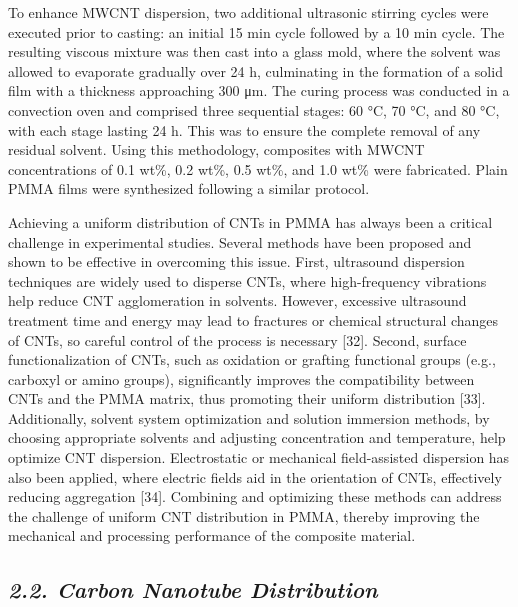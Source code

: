 \documentclass{article}
\begin{document}
To enhance MWCNT dispersion, two additional ultrasonic stirring cycles were executed prior to casting: an initial 15 min cycle followed by a 10 min cycle. The resulting viscous mixture was then cast into a glass mold, where the solvent was allowed to evaporate gradually over 24 h, culminating in the formation of a solid film with a thickness approaching 300 μm. The curing process was conducted in a convection oven and comprised three sequential stages: 60 °C, 70 °C, and 80 °C, with each stage lasting 24 h. This was to ensure the complete removal of any residual solvent. Using this methodology, composites with MWCNT concentrations of 0.1 wt\%, 0.2 wt\%, 0.5 wt\%, and 1.0 wt\% were fabricated. Plain PMMA films were synthesized following a similar protocol.

Achieving a uniform distribution of CNTs in PMMA has always been a critical challenge in experimental studies. Several methods have been proposed and shown to be effective in overcoming this issue. First, ultrasound dispersion techniques are widely used to disperse CNTs, where high-frequency vibrations help reduce CNT agglomeration in solvents. However, excessive ultrasound treatment time and energy may lead to fractures or chemical structural changes of CNTs, so careful control of the process is necessary [32]. Second, surface functionalization of CNTs, such as oxidation or grafting functional groups (e.g., carboxyl or amino groups), significantly improves the compatibility between CNTs and the PMMA matrix, thus promoting their uniform distribution [33]. Additionally, solvent system optimization and solution immersion methods, by choosing appropriate solvents and adjusting concentration and temperature, help optimize CNT dispersion. Electrostatic or mechanical field-assisted dispersion has also been applied, where electric fields aid in the orientation of CNTs, effectively reducing aggregation [34]. Combining and optimizing these methods can address the challenge of uniform CNT distribution in PMMA, thereby improving the mechanical and processing performance of the composite material.

\subsection*{\emph{2.2. Carbon Nanotube Distribution}}
\end{document}
